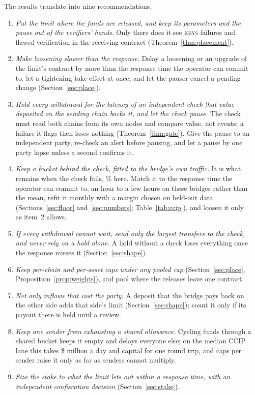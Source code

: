 \documentclass[conference,compsoc]{IEEEtran}
\numberwithin{equation}{section}
\theoremstyle{plain}
\theoremstyle{definition}
\theoremstyle{remark}
\newcommand{\ckeys}{\textsc{keys}}
\begin{document}
The results translate into nine recommendations.
\begin{enumerate}
\item \emph{Put the limit where the funds are released, and keep its parameters and the pause out of the verifiers' hands.} Only there does it see \ckeys{} failures and flawed verification in the receiving contract (Theorem~\ref{thm:placement}).
\item \emph{Make loosening slower than the response.} Delay a loosening or an upgrade of the limit's contract by more than the response time the operator can commit to, let a tightening take effect at once, and let the pauser cancel a pending change (Section~\ref{sec:place}).
\item \emph{Hold every withdrawal for the latency of an independent check that value deposited on the sending chain backs it, and let the check pause.} The check must read both chains from its own nodes and compare value, not events; a failure it flags then loses nothing (Theorem~\ref{thm:gate}). Give the pause to an independent party, re-check an alert before pausing, and let a pause by one party lapse unless a second confirms it.
\item \emph{Keep a bucket behind the check, fitted to the bridge's own traffic.} It is what remains when the check fails, \pbBucketPctR\% here. Match it to the response time the operator can commit to, an hour to a few hours on these bridges rather than the mean, refit it monthly with a margin chosen on held-out data (Sections~\ref{sec:floor} and~\ref{sec:numbers}; Table~\ref{tab:ccip}), and loosen it only as item~2 allows.
\item \emph{If every withdrawal cannot wait, send only the largest transfers to the check, and never rely on a hold alone.} A hold without a check loses everything once the response misses it (Section~\ref{sec:shape}).
\item \emph{Keep per-chain and per-asset caps under any pooled cap} (Section~\ref{sec:place}, Proposition~\ref{prop:weights}), and pool where the releases leave one contract.
\item \emph{Net only inflows that cost the party.} A deposit that the bridge pays back on the other side adds that side's limit (Section~\ref{sec:shape}); count it only if its payout there is held until a review.
\item \emph{Keep one sender from exhausting a shared allowance.} Cycling funds through a shared bucket keeps it empty and delays everyone else; on the median CCIP lane this takes \$\ccipGriefDayM{} million a day and capital for one round trip, and caps per sender raise it only as far as senders cannot multiply.
\item \emph{Size the stake to what the limit lets out within a response time, with an independent confiscation decision} (Section~\ref{sec:stake}).
\end{enumerate}
\end{document}
